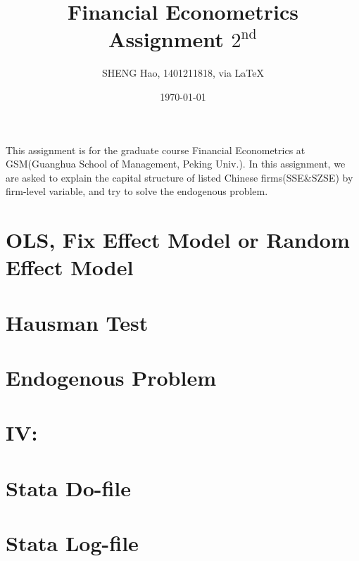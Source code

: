 \documentclass{article}
\begin{document}
\title{Financial Econometrics\\Assignment $2^{\text{nd}}$}
\author{{\normalsize SHENG Hao, 1401211818, via \LaTeX}}
\date{\today}

\maketitle

\def \Pr{{\rm Pr}}
\baselineskip 0.6cm

This assignment is for the graduate course Financial Econometrics at GSM(Guanghua School of Management, Peking Univ.). In this assignment, we are asked to explain the capital structure of listed Chinese firms(SSE\&SZSE) by firm-level variable, and try to solve the endogenous problem.
\section{OLS, Fix Effect Model or Random Effect Model}
\newpage

\section{Hausman Test}
\section{Endogenous Problem}
\section{IV: }

\section{Stata Do-file}
\section{Stata Log-file}
\begin{stlog}
\nullskip
\end{stlog}
\end{document}
